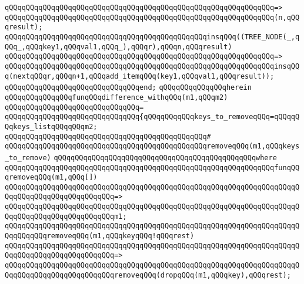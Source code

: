 \verb|qQQqqQQqqQQqqQQqqQQqqQQqqQQqqQQqqQQqqQQqqQQqqQQqqQQqqQQqqQQqqQQq=>|\newline
\verb|qQQqqQQqqQQqqQQqqQQqqQQqqQQqqQQqqQQqqQQqqQQqqQQqqQQqqQQqqQQqqQQq(n,qQQqresult);|\newline
\newline
\verb|qQQqqQQqqQQqqQQqqQQqqQQqqQQqqQQqqQQqqQQqqQQqqQQqinsqQQq((TREE_NODE(_,qQQq_,qQQqkey1,qQQqval1,qQQq_),qQQqr),qQQqn,qQQqresult)|\newline
\verb|qQQqqQQqqQQqqQQqqQQqqQQqqQQqqQQqqQQqqQQqqQQqqQQqqQQqqQQqqQQqqQQq=>|\newline
\verb|qQQqqQQqqQQqqQQqqQQqqQQqqQQqqQQqqQQqqQQqqQQqqQQqqQQqqQQqqQQqqQQqinsqQQq(nextqQQqr,qQQqn+1,qQQqadd_itemqQQq(key1,qQQqval1,qQQqresult));|\newline
\verb|qQQqqQQqqQQqqQQqqQQqqQQqqQQqqQQqend;|\newline
\verb|qQQqqQQqqQQqqQQqherein|\newline
\newline
\verb|qQQqqQQqqQQqqQQqfunqQQqdifference_withqQQq(m1,qQQqm2)|\newline
\verb|qQQqqQQqqQQqqQQqqQQqqQQqqQQqqQQq=|\newline
\verb|qQQqqQQqqQQqqQQqqQQqqQQqqQQqqQQq{qQQqqQQqqQQqkeys_to_removeqQQq=qQQqqQQqkeys_listqQQqqQQqm2;|\newline
\verb|qQQqqQQqqQQqqQQqqQQqqQQqqQQqqQQqqQQqqQQqqQQqqQQq#|\newline
\verb|qQQqqQQqqQQqqQQqqQQqqQQqqQQqqQQqqQQqqQQqqQQqqQQqremoveqQQq(m1,qQQqkeys_to_remove)|\newline
\verb|qQQqqQQqqQQqqQQqqQQqqQQqqQQqqQQqqQQqqQQqqQQqqQQqwhere|\newline
\verb|qQQqqQQqqQQqqQQqqQQqqQQqqQQqqQQqqQQqqQQqqQQqqQQqqQQqqQQqqQQqqQQqfunqQQqremoveqQQq(m1,qQQq[])|\newline
\verb|qQQqqQQqqQQqqQQqqQQqqQQqqQQqqQQqqQQqqQQqqQQqqQQqqQQqqQQqqQQqqQQqqQQqqQQqqQQqqQQqqQQqqQQqqQQqqQQq=>|\newline
\verb|qQQqqQQqqQQqqQQqqQQqqQQqqQQqqQQqqQQqqQQqqQQqqQQqqQQqqQQqqQQqqQQqqQQqqQQqqQQqqQQqqQQqqQQqqQQqqQQqm1;|\newline
\newline
\verb|qQQqqQQqqQQqqQQqqQQqqQQqqQQqqQQqqQQqqQQqqQQqqQQqqQQqqQQqqQQqqQQqqQQqqQQqqQQqqQQqremoveqQQq(m1,qQQqkeyqQQq!qQQqrest)|\newline
\verb|qQQqqQQqqQQqqQQqqQQqqQQqqQQqqQQqqQQqqQQqqQQqqQQqqQQqqQQqqQQqqQQqqQQqqQQqqQQqqQQqqQQqqQQqqQQqqQQq=>|\newline
\verb|qQQqqQQqqQQqqQQqqQQqqQQqqQQqqQQqqQQqqQQqqQQqqQQqqQQqqQQqqQQqqQQqqQQqqQQqqQQqqQQqqQQqqQQqqQQqqQQqremoveqQQq(dropqQQq(m1,qQQqkey),qQQqrest);|\newline
